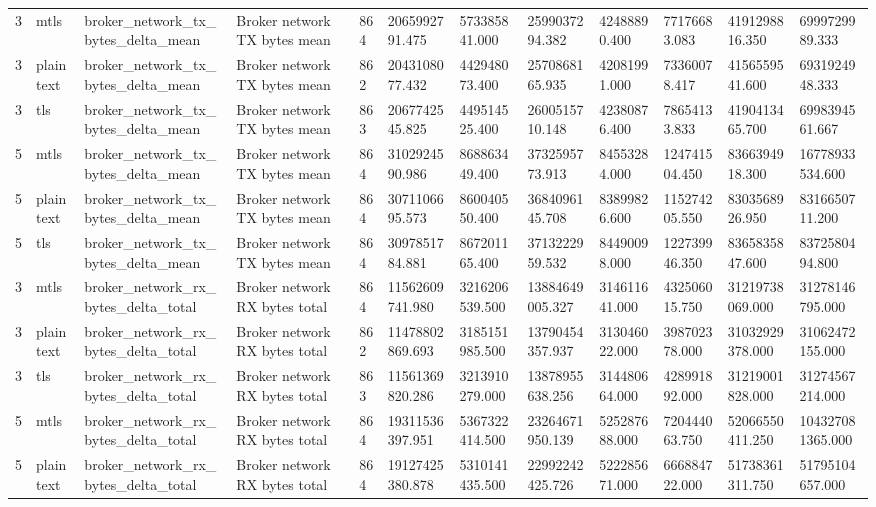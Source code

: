 \begin{longtable}{llllllllllll}
3 & mtls & broker\_network\_tx\_bytes\_delta\_mean & Broker network TX bytes mean & 864 & 2065992791.475 & 573385841.000 & 2599037294.382 & 42488890.400 & 77176683.083 & 4191298816.350 & 6999729989.333 \\
3 & plaintext & broker\_network\_tx\_bytes\_delta\_mean & Broker network TX bytes mean & 862 & 2043108077.432 & 442948073.400 & 2570868165.935 & 42081991.000 & 73360078.417 & 4156559541.600 & 6931924948.333 \\
3 & tls & broker\_network\_tx\_bytes\_delta\_mean & Broker network TX bytes mean & 863 & 2067742545.825 & 449514525.400 & 2600515710.148 & 42380876.400 & 78654133.833 & 4190413465.700 & 6998394561.667 \\
5 & mtls & broker\_network\_tx\_bytes\_delta\_mean & Broker network TX bytes mean & 864 & 3102924590.986 & 868863449.400 & 3732595773.913 & 84553284.000 & 124741504.450 & 8366394918.300 & 16778933534.600 \\
5 & plaintext & broker\_network\_tx\_bytes\_delta\_mean & Broker network TX bytes mean & 864 & 3071106695.573 & 860040550.400 & 3684096145.708 & 83899826.600 & 115274205.550 & 8303568926.950 & 8316650711.200 \\
5 & tls & broker\_network\_tx\_bytes\_delta\_mean & Broker network TX bytes mean & 864 & 3097851784.881 & 867201165.400 & 3713222959.532 & 84490098.000 & 122739946.350 & 8365835847.600 & 8372580494.800 \\
3 & mtls & broker\_network\_rx\_bytes\_delta\_total & Broker network RX bytes total & 864 & 11562609741.980 & 3216206539.500 & 13884649005.327 & 314611641.000 & 432506015.750 & 31219738069.000 & 31278146795.000 \\
3 & plaintext & broker\_network\_rx\_bytes\_delta\_total & Broker network RX bytes total & 862 & 11478802869.693 & 3185151985.500 & 13790454357.937 & 313046022.000 & 398702378.000 & 31032929378.000 & 31062472155.000 \\
3 & tls & broker\_network\_rx\_bytes\_delta\_total & Broker network RX bytes total & 863 & 11561369820.286 & 3213910279.000 & 13878955638.256 & 314480664.000 & 428991892.000 & 31219001828.000 & 31274567214.000 \\
5 & mtls & broker\_network\_rx\_bytes\_delta\_total & Broker network RX bytes total & 864 & 19311536397.951 & 5367322414.500 & 23264671950.139 & 525287688.000 & 720444063.750 & 52066550411.250 & 104327081365.000 \\
5 & plaintext & broker\_network\_rx\_bytes\_delta\_total & Broker network RX bytes total & 864 & 19127425380.878 & 5310141435.500 & 22992242425.726 & 522285671.000 & 666884722.000 & 51738361311.750 & 51795104657.000 \\

\end{longtable}
